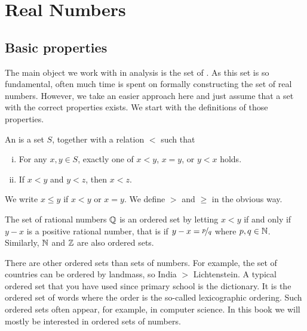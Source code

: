 \chapter{Real Numbers} \label{rn:chapter}


\section{Basic properties} \label{sec:basicpropsrn}


The main object we work with in analysis is the set of
.  As this set is so fundamental, often much time is
spent on formally constructing the set of real numbers.  However, we 
take an easier approach here and just assume that a set with the correct
properties exists.  We start with the definitions of those
properties.

\begin{defn}
An \emph{} is a set $S$, together with
a relation $<$ such that
\begin{enumerate}[(i)]
\item For any $x, y \in S$, exactly one of
$x < y$, $x=y$, or $y < x$ holds.
\item If $x < y$ and $y < z$, then $x < z$.
\end{enumerate}
We write $x \leq y$ if $x < y$ or $x=y$.  We define
$>$ and $\geq$ in the obvious way.
\end{defn}


The set of rational numbers ${\mathbb{Q}}$ is an ordered set by letting
$x < y$ if and only if $y-x$ is a positive rational number, that is
if $y-x = \nicefrac{p}{q}$ where $p,q \in {\mathbb{N}}$.  Similarly,
${\mathbb{N}}$ and ${\mathbb{Z}}$ are also ordered sets.

There are other ordered sets than sets of numbers.  For example, the
set of countries can be ordered by landmass, so India $>$
Lichtenstein.
A typical ordered set that you have used since primary school is the
dictionary.  It is the ordered set of words where the order is the
so-called lexicographic ordering.  Such ordered sets often appear, for
example, in
computer science.  In this book we will mostly be interested in ordered
sets of numbers.

